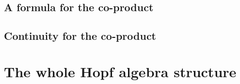 \subsection{A formula for the co-product}

\subsection{Continuity for the co-product}



\section{The whole Hopf algebra structure}
\label{sec:chap7_HopfAlgebra}